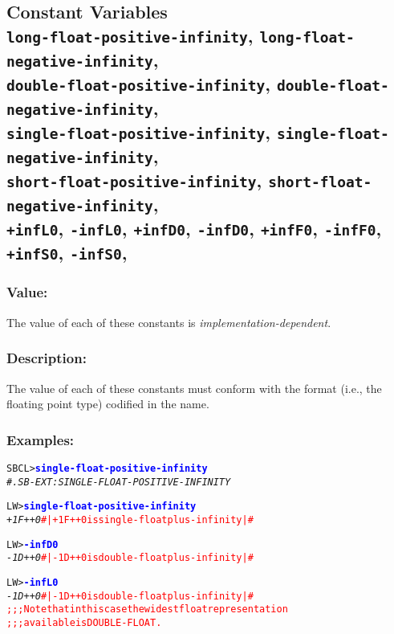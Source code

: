 \documentclass[fleqn]{article}
\newcommand{\code}[1]{\texttt{#1}}
\newcommand{\codeprompt}[1]{\textcolor{blue}{\textbf{#1}}}
\newcommand{\DDictionaryItem}[1]{\vspace*{6pt}\noindent\hrulefill\vspace*{-9pt}\subsection*{#1}}
\begin{document}
\DDictionaryItem{Constant Variables\\
  \code{long-float-positive-infinity},
  \code{long-float-negative-infinity},\\
  \code{double-float-positive-infinity},
  \code{double-float-negative-infinity},\\
  \code{single-float-positive-infinity},
  \code{single-float-negative-infinity},\\
  \code{short-float-positive-infinity},
  \code{short-float-negative-infinity},\\
  \code{+infL0}, 
  \code{-infL0},
  \code{+infD0}, 
  \code{-infD0},
  \code{+infF0}, 
  \code{-infF0},
  \code{+infS0}, 
  \code{-infS0},
  }

\subsubsection*{Value:}

The value of each of these constants is
\emph{implementation-dependent}.


\subsubsection*{Description:}

The value of each of these constants must conform with the format
(i.e., the floating point type) codified in the name.


\subsubsection*{Examples:}

\begin{alltt}
SBCL> \codeprompt{single-float-positive-infinity}
\textit{#.SB-EXT:SINGLE-FLOAT-POSITIVE-INFINITY}
\end{alltt}

\begin{alltt}
LW> \codeprompt{single-float-positive-infinity}
\textit{+1F++0} \textcolor{red}{#| +1F++0 is single-float plus-infinity |#}
\end{alltt}

\begin{alltt}
LW> \codeprompt{-infD0}
\textit{-1D++0} \textcolor{red}{#| -1D++0 is double-float plus-infinity |#}
\end{alltt}

\begin{alltt}
LW> \codeprompt{-infL0}
\textit{-1D++0} \textcolor{red}{#| -1D++0 is double-float plus-infinity |#}
\textcolor{red}{;;; Note that in this case the widest float representation
;;; available is DOUBLE-FLOAT.}
\end{alltt}
\end{document}
